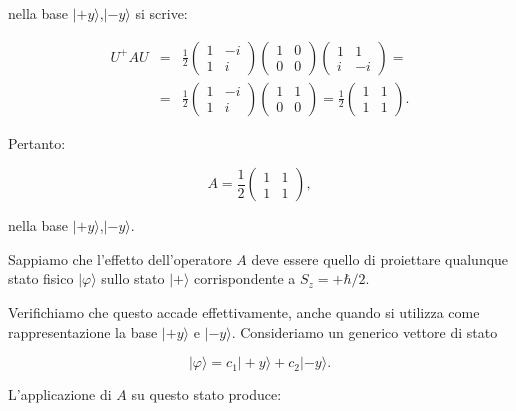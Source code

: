 nella base $| +y \rangle $,$| -y \rangle$ si scrive:

\begin{eqnarray}
U^+AU &=& \frac{1}{2}
\begin{pmatrix}
1 & -i\\
1 & i
\end{pmatrix}
\begin{pmatrix}
1 & 0\\
0 & 0
\end{pmatrix}
\begin{pmatrix}
1 & 1\\
i & -i
\end{pmatrix}= \nonumber \\
&=&\frac{1}{2}
\begin{pmatrix}
1 & -i\\
1 & i
\end{pmatrix}
\begin{pmatrix}
1 & 1\\
0 & 0
\end{pmatrix}=
\frac{1}{2}
\begin{pmatrix}
1 & 1\\
1 & 1
\end{pmatrix} .
\end{eqnarray}

Pertanto:

\begin{equation}
A= \frac{1}{2}
\begin{pmatrix}
1 & 1\\
1 & 1
\end{pmatrix} ,
\end{equation}

nella base $| +y \rangle $,$| -y \rangle $.

Sappiamo che l'effetto dell'operatore $A$ deve essere quello di proiettare qualunque stato fisico $| \varphi \rangle $ sullo stato $| + \rangle $ corrispondente a $S_z=+\hbar/2$.

Verifichiamo che questo accade effettivamente, anche quando si utilizza come rappresentazione la base $| +y \rangle $ e $| -y \rangle $. Consideriamo un generico vettore di stato

\begin{equation}
| \varphi \rangle = c_1 | +y \rangle + c_2| -y \rangle .
\end{equation}


L'applicazione di $A$ su questo stato produce:

